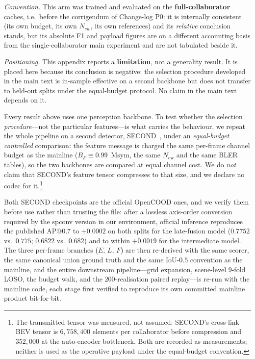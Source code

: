 \documentclass[journal]{IEEEtran}
\begin{document}
\noindent\emph{Convention.} This arm was trained and evaluated on the \textbf{full-collaborator} caches, i.e.\ before the corrigendum of Change-log P0: it is internally consistent (its own budget, its own $N_{cw}$, its own references) and its \emph{relative} conclusion stands, but its absolute F1 and payload figures are on a different accounting basis from the single-collaborator main experiment and are not tabulated beside it.

\noindent\emph{Positioning.} This appendix reports a \textbf{limitation}, not a generality result. It is placed here because its conclusion is negative: the selection procedure developed in the main text is in-sample effective on a second backbone but does not transfer to held-out splits under the equal-budget protocol. No claim in the main text depends on it.

Every result above uses one perception backbone. To test whether the selection
\emph{procedure}---not the particular features---is what carries the behaviour, we repeat the whole
pipeline on a second detector, SECOND~\cite{yan2018second}, under an \emph{equal-budget controlled}
comparison: the feature message is charged the same per-frame channel budget as the mainline
($B_F\equiv0.99$~Msym, the same $N_{\mathrm{cw}}$ and the same BLER tables), so the two backbones are
compared at equal channel cost. We do \emph{not} claim that SECOND's feature tensor compresses to
that size, and we declare no codec for it.\footnote{The transmitted tensor was measured, not assumed:
SECOND's cross-link BEV tensor is $6{,}758{,}400$ elements per collaborator before compression and
$352{,}000$ at the auto-encoder bottleneck. Both are recorded as measurements; neither is used as
the operative payload under the equal-budget convention.}

Both SECOND checkpoints are the official OpenCOOD ones, and we verify them before use rather than
trusting the file: after a lossless axis-order conversion required by the spconv version in our
environment, official inference reproduces the published AP@$0.7$ to $+0.0002$ on both splits for the
late-fusion model ($0.7752$ vs.\ $0.775$; $0.6822$ vs.\ $0.682$) and to within $+0.0019$ for the
intermediate model. The three per-frame branches ($E$, $L$, $F$) are then re-derived with the same
scorer, the same canonical union ground truth and the same IoU-$0.5$ convention as the mainline, and
the entire downstream pipeline---grid expansion, scene-level $9$-fold LOSO, the budget walk, and the
$200$-realisation paired replay---is re-run with the mainline code, each stage first verified to
reproduce its own committed mainline product bit-for-bit.
\end{document}
